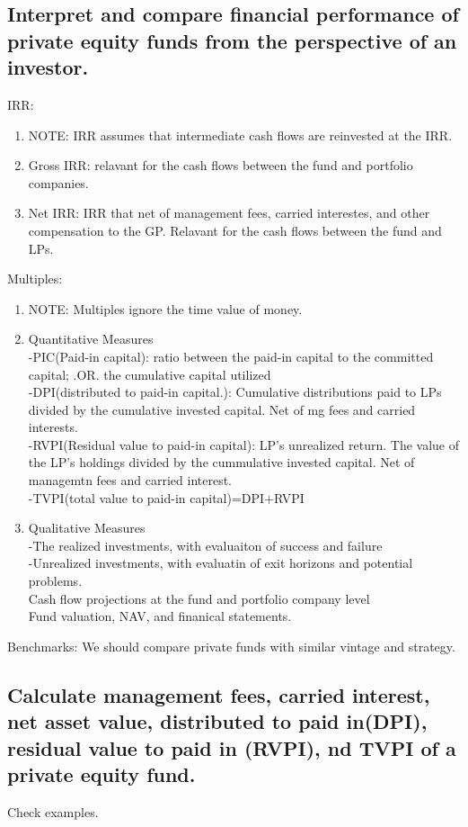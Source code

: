 \documentclass{article}
\newcommand{\be}{\begin{enumerate}}
\newcommand{\ee}{\end{enumerate}}
\begin{document}
\subsection{Interpret and compare financial performance of private equity funds from 
the perspective of an investor.}
IRR: 
\be
    \item NOTE: IRR assumes that intermediate cash flows are reinvested at the IRR.
    \item Gross IRR: relavant for the cash flows between the fund and portfolio companies.
    \item Net IRR: IRR that net of management fees, carried interestes, and other compensation to
    the GP. Relavant for the cash flows between the fund and LPs.
\ee
Multiples:
\be
    \item NOTE: Multiples ignore the time value of money.
    \item Quantitative Measures
    \\-PIC(Paid-in capital): ratio between the paid-in capital to the committed capital; .OR.
    the cumulative capital utilized
    \\-DPI(distributed to paid-in capital.): Cumulative distributions paid to LPs divided
    by the cumulative invested capital. Net of mg fees and carried interests.
    \\-RVPI(Residual value to paid-in capital): LP's unrealized return. The value of the LP's holdings
    divided by the cummulative invested capital. Net of managemtn fees and carried interest.
    \\-TVPI(total value to paid-in capital)=DPI+RVPI
    \item Qualitative Measures
    \\-The realized investments, with evaluaiton of success and failure
    \\-Unrealized investments, with evaluatin of exit horizons and potential problems.
    \\Cash flow projections at the fund and portfolio company level
    \\Fund valuation, NAV, and finanical statements.
\ee
Benchmarks: We should compare private funds with similar vintage and strategy.
\subsection{Calculate management fees, carried interest, net asset value, distributed
to paid in(DPI), residual value to paid in (RVPI), nd TVPI of a private equity fund.}
Check examples.
\end{document}
